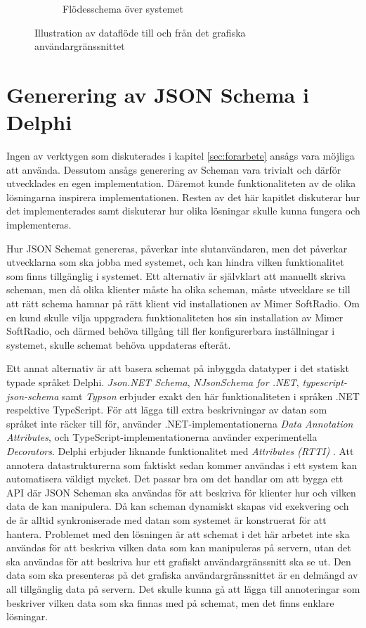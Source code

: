 \begin{figure}
\begin{subfigure}{0.5\textwidth}
		\caption{Flödesschema över systemet}
		\label{fig:system:upp}	
	\end{subfigure}
	\caption{Illustration av dataflöde till och från det grafiska användargränssnittet}
	\label{fig:system}
\end{figure}

\section{Generering av JSON Schema i Delphi}

Ingen av verktygen som diskuterades i kapitel \ref{sec:forarbete} ansågs vara möjliga att använda. Dessutom ansågs generering av Scheman vara trivialt och därför utvecklades en egen implementation. Däremot kunde funktionaliteten av de olika lösningarna inspirera implementationen. Resten av det här kapitlet diskuterar hur det implementerades samt diskuterar hur olika lösningar skulle kunna fungera och implementeras.

Hur JSON Schemat genereras, påverkar inte slutanvändaren, men det påverkar utvecklarna som ska jobba med systemet, och kan hindra vilken funktionalitet som finns tillgänglig i systemet. Ett alternativ är självklart att manuellt skriva scheman, men då olika klienter måste ha olika scheman, måste utvecklare se till att rätt schema hamnar på rätt klient vid installationen av Mimer SoftRadio. Om en kund skulle vilja uppgradera funktionaliteten hos sin installation av Mimer SoftRadio, och därmed behöva tillgång till fler konfigurerbara inställningar i systemet, skulle schemat behöva uppdateras efteråt.

Ett annat alternativ är att basera schemat på inbyggda datatyper i det statiskt typade språket Delphi. \textit{Json.NET Schema}, \textit{NJsonSchema for .NET}, \textit{typescript-json-schema} samt \textit{Typson} erbjuder exakt den här funktionaliteten i språken .NET respektive TypeScript. För att lägga till extra beskrivningar av datan som språket inte räcker till för, använder .NET-implementationerna \textit{Data Annotation Attributes}, och TypeScript-implementationerna använder experimentella \textit{Decorators}. \cite{Suter,Newtonsoft,El-Dardiry,Bovet} Delphi erbjuder liknande funktionalitet med \textit{Attributes (RTTI)} \cite{Embarcadero2016}. Att annotera datastrukturerna som faktiskt sedan kommer användas i ett system kan automatisera väldigt mycket. Det passar bra om det handlar om att bygga ett API där JSON Scheman ska användas för att beskriva för klienter hur och vilken data de kan manipulera. Då kan scheman dynamiskt skapas vid exekvering och de är alltid synkroniserade med datan som systemet är konstruerat för att hantera. Problemet med den lösningen är att schemat i det här arbetet inte ska användas för att beskriva vilken data som kan manipuleras på servern, utan det ska användas för att beskriva hur ett grafiskt användargränssnitt ska se ut. Den data som ska presenteras på det grafiska användargränssnittet är en delmängd av all tillgänglig data på servern. Det skulle kunna gå att lägga till annoteringar som beskriver vilken data som ska finnas med på schemat, men det finns enklare lösningar.

